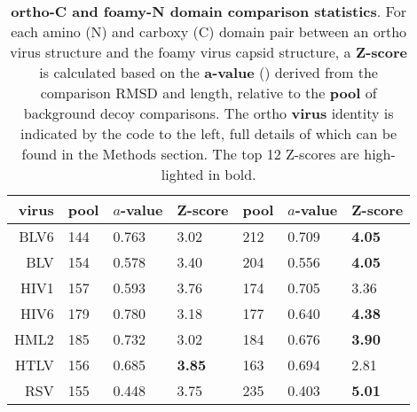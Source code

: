 \begin{table}
\begin{tabular}{r|lll|lll|}
\hline \hline
virus  & pool & $a$-value & Z-score & pool & $a$-value & Z-score \\
\hline
BLV6   &  144  & 0.763 &      3.02  &  212  & 0.709 & {\bf 4.05} \\
BLV    &  154  & 0.578 &      3.40  &  204  & 0.556 & {\bf 4.05} \\
HIV1   &  157  & 0.593 &      3.76  &  174  & 0.705 &      3.36  \\
HIV6   &  179  & 0.780 &      3.18  &  177  & 0.640 & {\bf 4.38} \\
HML2   &  185  & 0.732 &      3.02  &  184  & 0.676 & {\bf 3.90} \\
HTLV   &  156  & 0.685 & {\bf 3.85} &  163  & 0.694 &      2.81  \\
RSV    &  155  & 0.448 &      3.75  &  235  & 0.403 & {\bf 5.01} \\
\hline \hline
\end{tabular}
\begin{footnotesize}
\caption{
\label{Tab:Zscores}
{\bf ortho-C and foamy-N domain comparison statistics}.
For each amino (N) and carboxy (C) domain pair between an ortho virus structure and the foamy virus capsid structure,
a {\bf Z-score} is calculated based on the {\bf a-value} () derived from the comparison RMSD and length,
relative to the {\bf pool} of background decoy comparisons.   The ortho {\bf virus} identity is indicated by the 
code to the left, full details of which can be found in the Methods section.
The top 12 Z-scores are high-lighted in bold.
}
\end{footnotesize}
\end{table}

